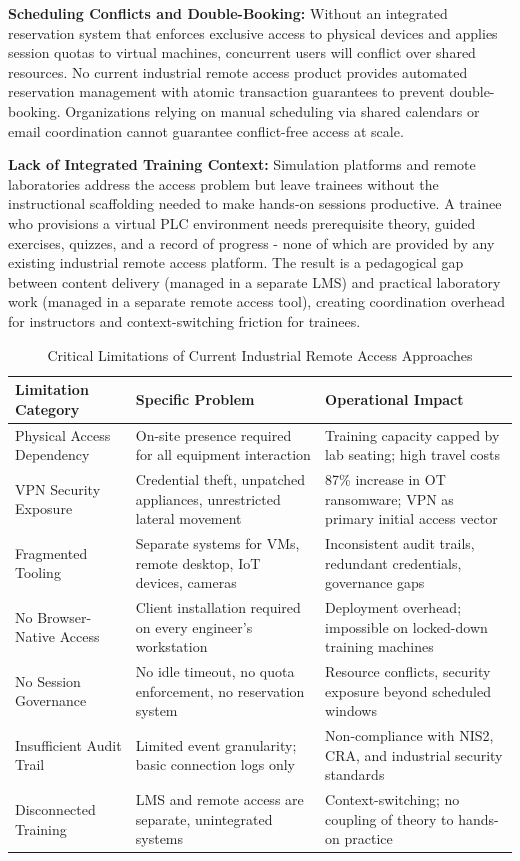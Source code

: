 \textbf{Scheduling Conflicts and Double-Booking:} Without an integrated
reservation system that enforces exclusive access to physical devices and
applies session quotas to virtual machines, concurrent users will conflict
over shared resources. No current industrial remote access product provides
automated reservation management with atomic transaction guarantees to prevent
double-booking. Organizations relying on manual scheduling via shared calendars
or email coordination cannot guarantee conflict-free access at scale.

\textbf{Lack of Integrated Training Context:} Simulation platforms and remote
laboratories address the access problem but leave trainees without the
instructional scaffolding needed to make hands-on sessions productive. A trainee
who provisions a virtual PLC environment needs prerequisite theory, guided
exercises, quizzes, and a record of progress - none of which are provided
by any existing industrial remote access platform. The result is a pedagogical
gap between content delivery (managed in a separate LMS) and practical
laboratory work (managed in a separate remote access tool), creating
coordination overhead for instructors and context-switching friction for trainees.

\begin{table}[H]
\centering
\caption{Critical Limitations of Current Industrial Remote Access Approaches}
\begin{tabular}{|p{3.3cm}|p{5.2cm}|p{5cm}|}
\hline
\textbf{Limitation Category} & \textbf{Specific Problem} & \textbf{Operational Impact} \\ \hline
Physical Access Dependency
    & On-site presence required for all equipment interaction
    & Training capacity capped by lab seating; high travel costs \\ \hline
VPN Security Exposure
    & Credential theft, unpatched appliances, unrestricted lateral movement
    & 87\% increase in OT ransomware; VPN as primary initial access vector \\ \hline
Fragmented Tooling
    & Separate systems for VMs, remote desktop, IoT devices, cameras
    & Inconsistent audit trails, redundant credentials, governance gaps \\ \hline
No Browser-Native Access
    & Client installation required on every engineer's workstation
    & Deployment overhead; impossible on locked-down training machines \\ \hline
No Session Governance
    & No idle timeout, no quota enforcement, no reservation system
    & Resource conflicts, security exposure beyond scheduled windows \\ \hline
Insufficient Audit Trail
    & Limited event granularity; basic connection logs only
    & Non-compliance with NIS2, CRA, and industrial security standards \\ \hline
Disconnected Training
    & LMS and remote access are separate, unintegrated systems
    & Context-switching; no coupling of theory to hands-on practice \\ \hline
\end{tabular}
\label{tab:current-limitations}
\end{table}

